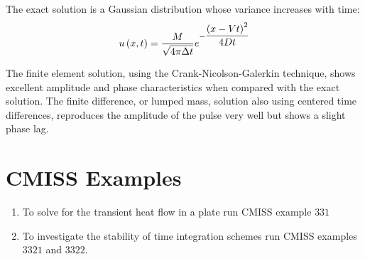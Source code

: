 The exact solution is a Gaussian distribution whose variance increases with
time:
\begin{equation}
   u\left( x,t \right)  =  \dfrac{M}{\sqrt{4\pi\Delta t}} 
    e^{-\dfrac{\left( x-Vt \right)^{2}}{4Dt}}
 \label{eqn:Gdist}
\end{equation}

The finite element solution, using the Crank-Nicolson-Galerkin technique,
shows excellent amplitude and phase characteristics when compared with the
exact solution. The finite difference, or lumped mass, solution also using
centered time differences, reproduces the amplitude of the pulse very well but
shows a slight phase lag.

\section{CMISS Examples}

\begin{enumerate}
\item   To solve for the transient heat flow in a plate run CMISS example $331$

\item  To investigate the stability of time integration schemes run CMISS
  examples $3321$ and $3322$.
\end{enumerate}



